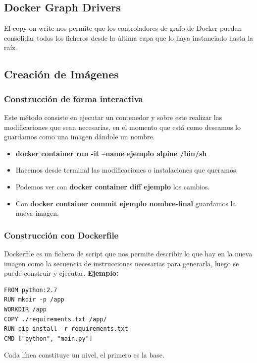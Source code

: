 \documentclass[12pt, twoside, openright]{report} %
\begin{document}
\subsection{Docker Graph Drivers}
El copy-on-write nos permite que los controladores de grafo de Docker puedan consolidar todos los ficheros desde la última capa que lo haya instanciado hasta la raíz.

\subsection{Creación de Imágenes}
\subsubsection{Construcción de forma interactiva}
Este método consiste en ejecutar un contenedor y sobre este realizar las modificaciones que sean necesarias, en el momento que está como deseamos lo guardamos como una imagen dándole un nombre.
\begin{itemize}
	\item \textbf{docker container run -it --name ejemplo alpine /bin/sh}
	\item Hacemos desde terminal las modificaciones o instalaciones que queramos.
	\item Podemos ver con \textbf{docker container diff ejemplo} los cambios.
	\item Con \textbf{docker container commit ejemplo nombre-final} guardamos la nueva imagen.
\end{itemize}

\subsubsection{Construcción con Dockerfile}
Dockerfile es un fichero de script que nos permite describir lo que hay en la nueva imagen como la secuencia de instrucciones necesarias para generarla, luego se puede construir y ejecutar. \textbf{Ejemplo:}
\begin{lstlisting}
FROM python:2.7
RUN mkdir -p /app
WORKDIR /app
COPY ./requirements.txt /app/
RUN pip install -r requirements.txt
CMD ["python", "main.py"]
\end{lstlisting}

Cada línea constituye un nivel, el primero es la base.
\pagebreak
\end{document}

